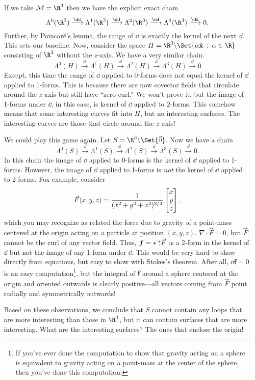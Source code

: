 If we take $\mathcal M=\R^3$ then we have the explicit exact chain
\[
	\Lambda^0(\R^3) \xrightarrow{\dd}
	\Lambda^1(\R^3)\xrightarrow{\dd} 
	\Lambda^{2}(\R^3)\xrightarrow{\dd}  
	\Lambda^{3}(\R^3)\xrightarrow{\dd}  0.
\]
Further, by Poincar\'e's lemma, the range of $\dd$ is exactly the kernel of the next $\dd$.
This sets our baseline.  Now, consider the space $H=\R^3\backslash\Set{\alpha\xhat\given\alpha\in\R}$
consisting of $\R^3$ without the $z$-axis.  We have a very similar chain.
\[
	\Lambda^0  (H) \xrightarrow{\dd}
	\Lambda^1  (H)\xrightarrow{\dd} 
	\Lambda^{2}(H)\xrightarrow{\dd}  
	\Lambda^{3}(H)\xrightarrow{\dd}  0
\]
Except, this time the range of $\dd$ applied to 0-forms does not equal the kernel
of $\dd$ applied to 1-forms.  This is because there are now covector fields
that circulate around the $z$-axis but still have ``zero curl.''  We won't prove it, but
the image of 1-forms under $\dd$, in this case, is kernel of $\dd$ applied to 2-forms.
This somehow means that some interesting curves fit into $H$, but no interesting surfaces.
The interesting curves are those that circle around the $z$-axis!

We could play this game again.  Let $S=\R^3\backslash\Set{\vec 0}$.  Now we have
a chain
\[
	\Lambda^0  (S) \xrightarrow{\dd}
	\Lambda^1  (S)\xrightarrow{\dd} 
	\Lambda^{2}(S)\xrightarrow{\dd}  
	\Lambda^{3}(S)\xrightarrow{\dd}  0.
\]
In this chain the image of $\dd$ applied to 0-forms is the kernel of $\dd$ applied to 1-forms.
However, the image of $\dd$ applied to 1-forms is \emph{not} the kernel of $\dd$ applied to
2-forms.  Fox example, consider
\[
	\vec F(x,y,z) = \frac{1}{(x^2+y^2+z^2)^{3/2}}\mat{x\\y\\z},
\]
which you may recognize as related the force due to gravity of a point-mass centered
at the origin acting on a particle at position $(x,y,z)$.  $\nabla \cdot \vec F=0$,
but $\vec F$ cannot be the curl of any vector field. Thus, $\bm f=\star \operatorname{\uparrow\!}\vec F$ is a
2-form in the kernel of $\dd$ but not the image of any 1-form under $\dd$.  This would be very
hard to show directly from equations, but easy to show with Stokes's theorem.  After all,
$\dd \bm f=0$ is an easy computation\footnote{
	If you've ever done the computation to show that gravity acting on a sphere is
	equivalent to gravity acting on a point-mass at the center of the sphere, then
	you've done this computation.  
}, but the integral of $\bm f$ around a sphere centered at
the origin and oriented outwards is clearly positive---all vectors coming from $\vec F$ point
radially and symmetrically outwards!

Based on these observations,
we conclude that $S$ cannot contain any loops that are more interesting than those in $\R^3$, but
it can contain surfaces that are more interesting.  What are the interesting surfaces?  The ones
that enclose the origin!
